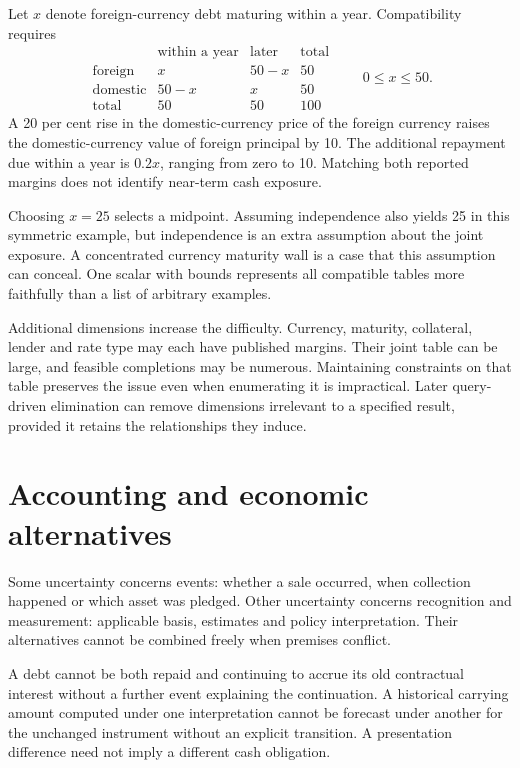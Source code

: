 Let $x$ denote foreign-currency debt maturing within a year. Compatibility requires
\begin{equation}
\begin{array}{c|cc|c}
 &\text{within a year}&\text{later}&\text{total}\\\hline
 \text{foreign}&x&50-x&50\\
 \text{domestic}&50-x&x&50\\\hline
 \text{total}&50&50&100
\end{array}
\qquad 0\leq x\leq50.
\label{sim:joint-debt-table}
\end{equation}
A 20 per cent rise in the domestic-currency price of the foreign currency raises the domestic-currency value of foreign principal by 10. The additional repayment due within a year is $0.2x$, ranging from zero to 10. Matching both reported margins does not identify near-term cash exposure.

Choosing $x=25$ selects a midpoint. Assuming independence also yields 25 in this symmetric example, but independence is an extra assumption about the joint exposure. A concentrated currency maturity wall is a case that this assumption can conceal. One scalar with bounds represents all compatible tables more faithfully than a list of arbitrary examples.

Additional dimensions increase the difficulty. Currency, maturity, collateral, lender and rate type may each have published margins. Their joint table can be large, and feasible completions may be numerous. Maintaining constraints on that table preserves the issue even when enumerating it is impractical. Later query-driven elimination can remove dimensions irrelevant to a specified result, provided it retains the relationships they induce.

\section{Accounting and economic alternatives}
Some uncertainty concerns events: whether a sale occurred, when collection happened or which asset was pledged. Other uncertainty concerns recognition and measurement: applicable basis, estimates and policy interpretation. Their alternatives cannot be combined freely when premises conflict.

A debt cannot be both repaid and continuing to accrue its old contractual interest without a further event explaining the continuation. A historical carrying amount computed under one interpretation cannot be forecast under another for the unchanged instrument without an explicit transition. A presentation difference need not imply a different cash obligation.

